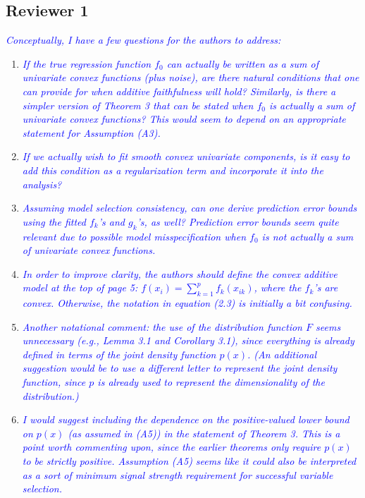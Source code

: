 \documentclass[pdftex,12pt]{article}
\def\reviewercomment#1{{\it\textcolor{blue}{#1}}\smallskip}
\begin{document}
\subsection*{Reviewer 1}

\reviewercomment{Conceptually, I have a few questions for the authors to address:}

\begin{enumerate}[(1)]
\item \reviewercomment{If the true regression function $f_0$ can actually be written as a
sum of univariate convex functions (plus noise), are there natural
conditions that one can provide for when additive faithfulness will
hold? Similarly, is there a simpler version of Theorem 3 that can be
stated when $f_0$ is actually a sum of univariate convex functions? This
would seem to depend on an appropriate statement for Assumption (A3).}

\item \reviewercomment{If we actually wish to fit smooth convex univariate components, is
it easy to add this condition as a regularization term and incorporate
it into the analysis?}

\item \reviewercomment{Assuming model selection consistency, can one derive prediction
error bounds using the fitted $f_k$'s and $g_k$'s, as well? Prediction error
bounds seem quite relevant due to possible model misspecification when
$f_0$ is not actually a sum of univariate convex functions.}

\item \reviewercomment{In order to improve clarity, the authors should define the convex
additive model at the top of page 5: $f(x_i) = \sum_{k=1}^p f_k(x_{ik})$, where the
$f_k$'s are convex.  Otherwise, the notation in equation (2.3) is
initially a bit confusing.}

\item \reviewercomment{Another notational comment: the use of the
distribution function $F$ seems unnecessary (e.g., Lemma 3.1 and
Corollary 3.1), since everything is already defined in terms of the
joint density function $p(x)$. (An additional suggestion would be to use
a different letter to represent the joint density function, since $p$ is
already used to represent the dimensionality of the distribution.)}

\item \reviewercomment{I would suggest including the dependence on the positive-valued lower
bound on $p(x)$ (as assumed in (A5)) in the statement of Theorem 3. This
is a point worth commenting upon, since the earlier theorems only
require $p(x)$ to be strictly positive. Assumption (A5) seems like it
could also be interpreted as a sort of minimum signal strength
requirement for successful variable selection.}


\end{enumerate}
\end{document}
